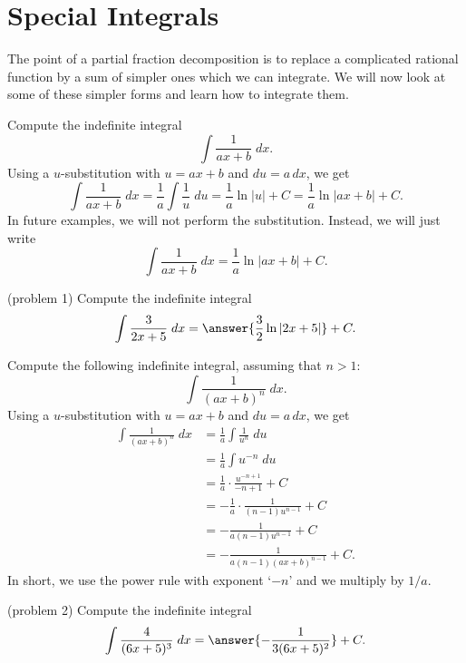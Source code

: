 \documentclass[handout]{ximera}
\begin{document}
\section{Special Integrals}
The point of a partial fraction decomposition is to replace a complicated rational function by a sum of simpler ones which we can integrate.
We will now look at some of these simpler forms and learn how to integrate them.

\begin{example}[example 1]
Compute the indefinite integral
\[
\int \frac{1}{ax+b} \; dx.
\]
Using a $u$-substitution with $u = ax+b$ and $du = a \, dx$,
we get
\[
\int \frac{1}{ax+b} \; dx = \frac{1}{a} \int \frac{1}{u} \; du = \frac{1}{a} \ln|u| + C = \frac{1}{a} \ln|ax+b| + C.
\]
In future examples, we will not perform the substitution.  Instead, we will just write
\[
\int \frac{1}{ax+b} \; dx = \frac{1}{a} \ln|ax+b| + C.
\]
\end{example}

\begin{problem}(problem 1)
Compute the indefinite integral
\[
\int \frac{3}{2x+5} \; dx = \answer{\frac32 \ln|2x+5|} + C.
\]
\end{problem}

\begin{example}[example 2]
Compute the following indefinite integral, assuming that $n > 1$:
\[
\int \frac{1}{(ax+b)^n} \; dx.
\]
Using a $u$-substitution with $u = ax+b$ and $du = a \, dx$,
we get
\begin{align*}
\int \frac{1}{(ax+b)^n} \; dx &= \frac{1}{a} \int \frac{1}{u^n} \; du \\
                              &= \frac{1}{a} \int u^{-n} \; du \\
                              &= \frac{1}{a} \cdot \frac{u^{-n+1}}{-n+1} + C \\
                              &= -\frac{1}{a} \cdot \frac{1}{(n-1)u^{n-1}} + C\\
                              &= -\frac{1}{a(n-1)u^{n-1}} + C\\
                              &= -\frac{1}{a(n-1)(ax+b)^{n-1}} + C.
\end{align*}
In short, we use the power rule with exponent `$-n$' and we multiply by $1/a$.
\end{example}

\begin{problem}(problem 2)
Compute the indefinite integral
\[
\int \frac{4}{(6x+ 5)^3} \; dx = \answer{-\frac{1}{3(6x+5)^2}} + C.
\]

\end{problem}
\end{document}

